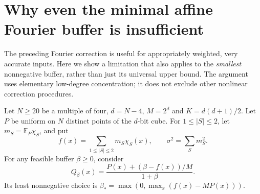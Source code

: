 \section{Why even the minimal affine Fourier buffer is insufficient}
\label{sec:minimal-buffer-obstruction}
The preceding Fourier correction is useful for appropriately weighted,
very accurate inputs. Here we show a limitation that also applies to
the \emph{smallest} nonnegative buffer, rather than just its universal
upper bound. The argument uses elementary low-degree concentration;
it does not exclude other nonlinear correction procedures.

Let $N\ge20$ be a multiple of four, $d=N-4$, $M=2^d$ and
$K=d(d+1)/2$. Let $P$ be uniform on $N$ distinct points of the
$d$-bit cube. For $1\le|S|\le2$, let
$m_S=\mathbb E_P\chi_S$, and put
\[
 f(x)=\sum_{1\le|S|\le2}m_S\chi_S(x),\qquad
 \sigma^2=\sum_Sm_S^2.
\]
For any feasible buffer $\beta\ge0$, consider
\[
 Q_\beta(x)=\frac{P(x)+(\beta-f(x))/M}{1+\beta}.
\]
Its least nonnegative choice is
$\beta_* =\max(0,\max_x(f(x)-MP(x)))$.

